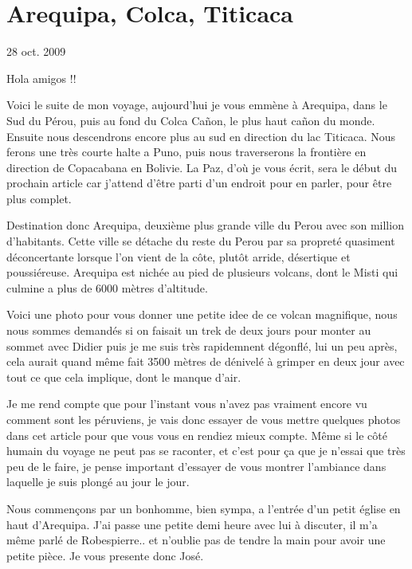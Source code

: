 \section{Arequipa, Colca, Titicaca}

28 oct. 2009

\begin{multicols}{2}

Hola amigos !!

Voici le suite de mon voyage, aujourd'hui je vous emmène à Arequipa, dans le Sud du Pérou, puis au fond du Colca Cañon, le plus haut cañon du monde. Ensuite nous descendrons encore plus au sud en direction du lac Titicaca. Nous ferons une très courte halte a Puno, puis nous traverserons la frontière en direction de Copacabana en Bolivie. La Paz, d'où je vous écrit, sera le début du prochain article car j'attend d'être parti d'un endroit pour en parler, pour être plus complet.

Destination donc Arequipa, deuxième plus grande ville du Perou avec son million d'habitants. Cette ville se détache du reste du Perou par sa propreté quasiment déconcertante lorsque l'on vient de la côte, plutôt arride, désertique et poussiéreuse. Arequipa est nichée au pied de plusieurs volcans, dont le Misti qui culmine a plus de 6000 mètres d'altitude.

Voici une photo pour vous donner une petite idee de ce volcan magnifique, nous nous sommes demandés si on faisait un trek de deux jours pour monter au sommet avec Didier puis je me suis très rapidemnent dégonflé, lui un peu après, cela aurait quand même fait 3500 mètres de dénivelé à grimper en deux jour avec tout ce que cela implique, dont le manque d'air.


Je me rend compte que pour l'instant vous n'avez pas vraiment encore vu comment sont les péruviens, je vais donc essayer de vous mettre quelques photos dans cet article pour que vous vous en rendiez mieux compte. Même si le côté humain du voyage ne peut pas se raconter, et c'est pour ça que je n'essai que très peu de le faire, je pense important d'essayer de vous montrer l'ambiance dans laquelle je suis plongé au jour le jour.

Nous commençons par un bonhomme, bien sympa, a l'entrée d'un petit église en haut d'Arequipa. J'ai passe une petite demi heure avec lui à discuter, il m'a même parlé de Robespierre.. et n'oublie pas de tendre la main pour avoir une petite pièce. Je vous presente donc José.


\end{multicols}

